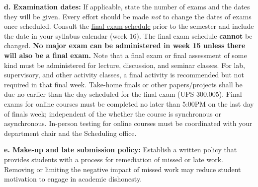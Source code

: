 \documentclass[12pt]{article}
\begin{document}
\noindent \textbf{d. Examination dates:} {\color{annotationblue}If applicable, state the number of exams and the dates they will be given. Every effort should be made \textit{not} to change the dates of exams once scheduled. Consult the \href{https://www.fullerton.edu/scheduling/final_exam_schedule/}{final exam schedule} prior to the semester and include the date in your syllabus calendar (week 16). The final exam schedule \textbf{cannot} be changed. \textbf{No major exam can be administered in week 15 unless there will also be a final exam.} Note that a final exam or final assessment of some kind must be administered for lecture, discussion, and seminar classes. For lab, supervisory, and other activity classes, a final activity is recommended but not required in that final week. Take-home finals or other papers/projects shall be due no earlier than the day scheduled for the final exam (UPS 300.005). Final exams for online courses must be completed no later than 5:00PM on the last day of finals week; independent of the whether the course is synchronous or asynchronous. In-person testing for online courses must be coordinated with your department chair and the Scheduling office.}

\vspace{0.5em}


\vspace{0.5em}


\vspace{1em}

\noindent \textbf{e. Make-up and late submission policy:} {\color{annotationblue}Establish a written policy that provides students with a process for remediation of missed or late work. Removing or limiting the negative impact of missed work may reduce student motivation to engage in academic dishonesty.}
\end{document}
